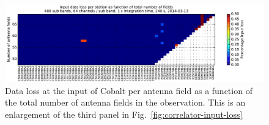 \documentclass[a4paper,twoside, 10pt]{report}
\begin{document}
\begin{figure}
  \begin{center}
    \includegraphics[angle=0,width=1.1\columnwidth]{correlator-input-loss-as-function-of-field-20140313.pdf}
  \end{center}
  \caption{Data loss at the input of Cobalt per antenna field as a
    function of the total number of antenna fields in the
    observation. This is an enlargement of the third panel in Fig.~\ref{fig:correlator-input-loss}}
  \label{fig:correlator-input-loss-20140313}
\end{figure}
\end{document}
